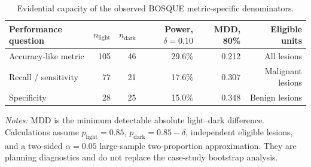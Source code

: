 \begin{table}[h!]
\centering
\scriptsize
\caption{Evidential capacity of the observed BOSQUE metric-specific denominators.}
\label{tab:orp-evidential-capacity-summary}
\setlength{\tabcolsep}{3.3pt}
\renewcommand{\arraystretch}{1.10}
\begin{tabular}{@{}lrrrrr@{}}
\toprule
\textbf{Performance question} & $n_{\mathrm{light}}$ & $n_{\mathrm{dark}}$ &
\textbf{Power, $\delta=0.10$} & \textbf{MDD, 80\%} & \textbf{Eligible units} \\
\midrule
Accuracy-like metric & 105 & 46 & 29.6\% & 0.212 & All lesions \\
Recall / sensitivity & 77 & 21 & 17.6\% & 0.307 & Malignant lesions \\
Specificity & 28 & 25 & 15.0\% & 0.348 & Benign lesions \\
\bottomrule
\end{tabular}

\vspace{2pt}
\parbox{0.98\textwidth}{\footnotesize
\textit{Notes:} MDD is the minimum detectable absolute light--dark difference.
Calculations assume $p_{\mathrm{light}}=0.85$,
$p_{\mathrm{dark}}=0.85-\delta$, independent eligible lesions, and a two-sided
$\alpha=0.05$ large-sample two-proportion approximation. They are planning
diagnostics and do not replace the case-study bootstrap analysis.}
\end{table}
